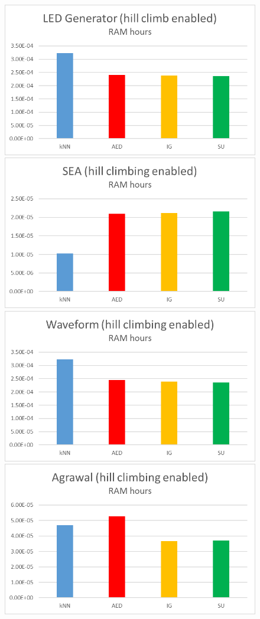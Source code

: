 \begin{figure}[hp]
\centering
\includegraphics[scale=0.17]{Graphs/LED/H_mem}
\includegraphics[scale=0.17]{Graphs/SEA/H_mem}
\includegraphics[scale=0.17]{Graphs/Waveform/H_mem}
\includegraphics[scale=0.17]{Graphs/Agrawal/H_mem}

\end{figure}
